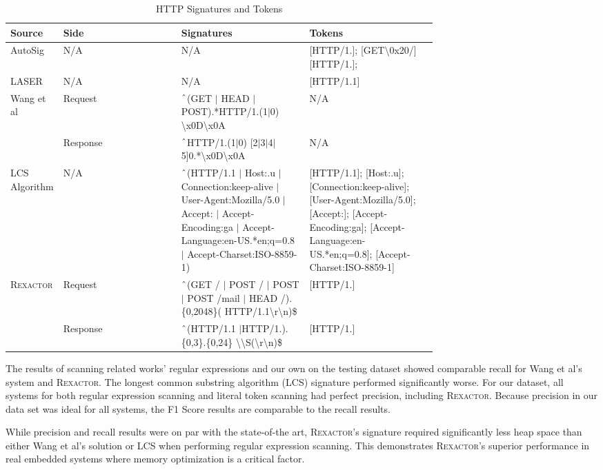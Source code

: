 \begin{table*}[t]
  \centering
  \begin{tabular}{|p{0.12\linewidth}|l|p{0.3\linewidth}|p{0.3\linewidth}|}
 \hline
 Source & Side & Signatures & Tokens \\ [0.5ex]
 \hline\hline
 AutoSig \cite{AutoSig} & N/A & N/A & [HTTP/1.]; [GET\textbackslash0x20/] [HTTP/1.];\\
 \hline
 LASER \cite{LASER} & N/A & N/A & [HTTP/1.1] \\
 \hline
 Wang et al \cite{WANG2012992} & Request & $\string^$(GET $\vert$ HEAD $\vert$ POST).*HTTP/1.(1$\vert$0) \textbackslash x0D\textbackslash x0A & N/A\\
 \cline{2-4}
  & Response & $\string^$HTTP/1.(1$\vert$0) [2$\vert$3$\vert$4$\vert$5]0.*\textbackslash x0D\textbackslash x0A & N/A \\
 \hline
 LCS Algorithm \cite{VinothGeorge2013EfficientRE} & N/A & $\string^$(HTTP/1.1 $\vert$ Host:.u $\vert$ Connection:keep-alive $\vert$ User-Agent:Mozilla/5.0 $\vert$ Accept: $\vert$ Accept-Encoding:ga $\vert$ Accept-Language:en-US.*en;q=0.8 $\vert$ Accept-Charset:ISO-8859-1)  & [HTTP/1.1]; [Host:.u]; [Connection:keep-alive]; [User-Agent:Mozilla/5.0]; [Accept:]; [Accept-Encoding:ga]; [Accept-Language:en-US.*en;q=0.8]; [Accept-Charset:ISO-8859-1]\\
 \hline
 \textsc{Rexactor} & Request & $\string^$(GET / $\vert$ POST / $\vert$ POST $\vert$ POST /mail $\vert$ HEAD /).\{0,2048\}( HTTP/1.1\textbackslash r\textbackslash n)\$ & [HTTP/1.]\\
 \cline{2-4}
 & Response & $\string^$(HTTP/1.1 $\vert$HTTP/1.).\{0,3\}.\{0,24\} \textbackslash\textbackslash S(\textbackslash r\textbackslash n)\$ & [HTTP/1.] \\ [1ex]
 \hline
  \end{tabular}
  \caption{HTTP Signatures and Tokens}
  \label{table:http}
\end{table*}

The results of scanning related works' regular expressions and our own on the testing dataset showed comparable recall for Wang et al's system and \textsc{Rexactor}. The longest common substring algorithm (LCS) signature performed significantly worse. For our dataset, all systems for both regular expression scanning and literal token scanning had perfect precision, including \textsc{Rexactor}. Because precision in our data set was ideal for all systems, the F1 Score results are comparable to the recall results.

While precision and recall results were on par with the state-of-the art, \textsc{Rexactor}'s signature required significantly less heap space than either Wang et al's solution or LCS when performing regular expression scanning. This demonstrates \textsc{Rexactor}'s superior performance in real embedded systems where memory optimization is a critical factor.

